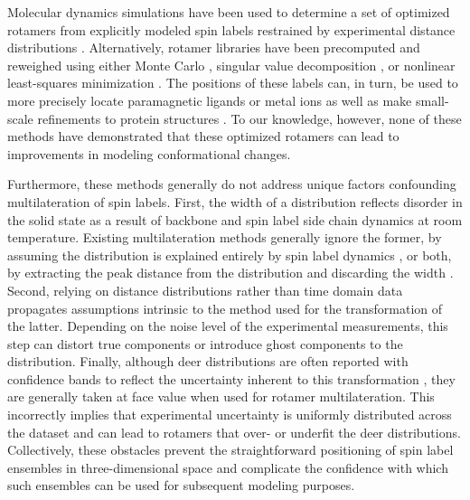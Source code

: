 Molecular dynamics simulations have been used to determine a set of optimized rotamers from explicitly modeled spin labels restrained by experimental distance distributions \citep*{Hustedt2018, Marinelli2015, Marinelli2019, Roux2013}. Alternatively, rotamer libraries have been precomputed and reweighed using either Monte Carlo \citep*{Gaffney2012, Hays2019}, singular value decomposition \citep*{Hagelueken2013}, or nonlinear least-squares minimization \citep*{Jeschke2018}. The positions of these labels can, in turn, be used to more precisely locate paramagnetic ligands or metal ions \citep*{Abdullin2015, Abdullin2021, Gaffney2012, Yang2012} as well as make small-scale refinements to protein structures \citep*{Reichel2018, Wingler2019}. To our knowledge, however, none of these methods have demonstrated that these optimized rotamers can lead to improvements in modeling conformational changes.

Furthermore, these methods generally do not address unique factors confounding multilateration of spin labels. First, the width of a distribution reflects disorder in the solid state as a result of backbone and spin label side chain dynamics at room temperature. Existing multilateration methods generally ignore the former, by assuming the distribution is explained entirely by spin label dynamics \citep*{Gaffney2012, Reichel2018}, or both, by extracting the peak distance from the distribution and discarding the width \citep*{Wingler2019}. Second, relying on distance distributions rather than time domain data propagates assumptions intrinsic to the method used for the transformation of the latter. Depending on the noise level of the experimental measurements, this step can distort true components or introduce ghost components to the distribution. Finally, although \gls{deer} distributions are often reported with confidence bands to reflect the uncertainty inherent to this transformation \citep*{Edwards2016, FabregasIbanez2020, Hustedt2018}, they are generally taken at face value when used for rotamer multilateration. This incorrectly implies that experimental uncertainty is uniformly distributed across the dataset and can lead to rotamers that over- or underfit the \gls{deer} distributions. Collectively, these obstacles prevent the straightforward positioning of spin label ensembles in three-dimensional space and complicate the confidence with which such ensembles can be used for subsequent modeling purposes.

